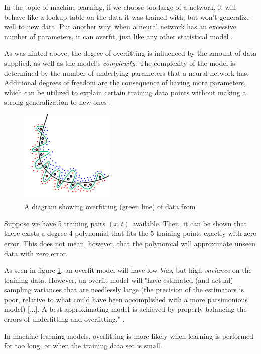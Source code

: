 \documentclass{article}
\begin{document}
In the topic of machine learning, if we choose too large of a network, it will behave like a lookup table on the data it was trained with, but won't generalize well to new data. Put another way, when a neural network has an excessive number of parameters, it can overfit, just like any other statistical model \citep{book:AIModernApp}.

As was hinted above, the degree of overfitting is influenced by the amount of data supplied, as well as the model's \textit{complexity}. The complexity of the model is determined by the number of underlying parameters that a neural network has. Additional degrees of freedom are the consequence of having more parameters, which can be utilized to explain certain training data points without making a strong generalization to new ones \citep{inbook:Aggarwal-4.1}.
\begin{figure} %
    \centering
    \label{Overfitting}
    \includegraphics[width=0.4\textwidth]{Overfitting}
    \caption{A diagram showing overfitting (green line) of data from \citep{overfitting-img}}
\end{figure}
\begin{example}
  Suppose we have 5 training pairs $(x, t)$ available. Then, it can be shown that there exists a degree 4 polynomial that fits the 5 training points exactly with zero error. This does not mean, however, that the polynomial will approximate unseen data with zero error. 
\end{example}
As seen in figure \ref{Overfitting}, an overfit model will have low \textit{bias}, but high \textit{variance} on the training data. However, an overfit model will "have estimated (and actual) sampling variances that are needlessly large (the precision of the estimators is poor, relative to what could have been accomplished with a more parsimonious model) [...]. A best approximating model is achieved by properly balancing the errors of underfitting and overfitting." \citep{burnham2002model}.
\begin{remark} 
  In machine learning models, overfitting is more likely when learning is performed for too long, or when the training data set is small.
\end{remark}
\end{document}

